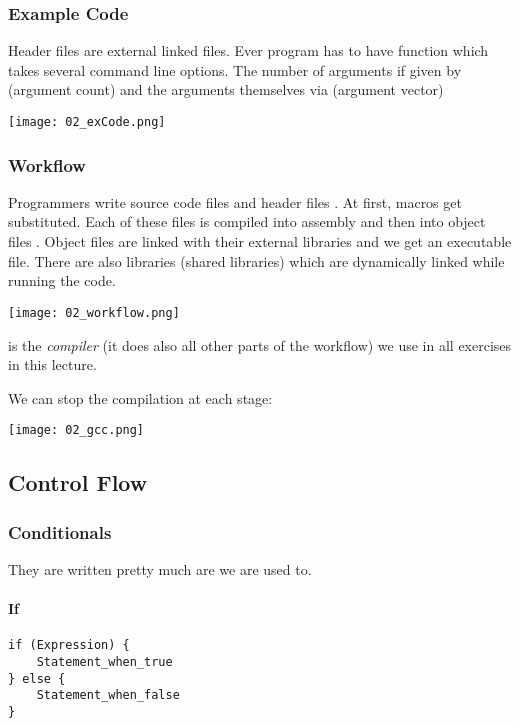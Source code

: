 
\subsubsection{Example Code}
Header files are external linked files. Ever program has to have  function which takes several command line options. The number of arguments if given by  (argument count) and the arguments themselves via  (argument vector)

\texttt{[image: 02\_exCode.png]}

\subsubsection{Workflow}
Programmers write source code  files and header files . At first, macros get substituted. Each of these files is compiled into assembly  and then into object files . Object files are linked with their external libraries  and we get an executable file. There are also libraries (shared libraries)  which are dynamically linked while running the code.

\texttt{[image: 02\_workflow.png]}

 is the \textit{compiler} (it does also all other parts of the workflow) we use in all exercises in this lecture.

We can stop the compilation at each stage:

\texttt{[image: 02\_gcc.png]}

\subsection*{Control Flow}

\subsubsection{Conditionals}
They are written pretty much are we are used to.

\paragraph{If}
\begin{lstlisting}
if (Expression) {
    Statement_when_true
} else {
    Statement_when_false
}
\end{lstlisting}

